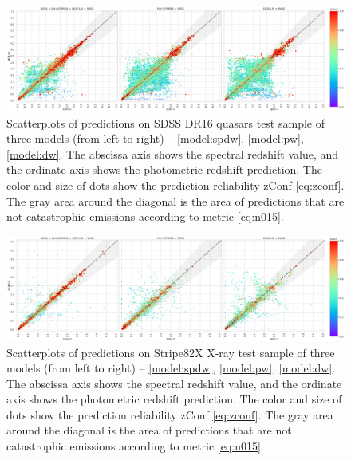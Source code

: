 \documentclass[fleqn,usenatbib]{mnras}
\begin{document}
\begin{figure}
    \centering
    \includegraphics[width=0.9\linewidth]{images/scatterplots-dr16q-wo-train.png}
    \caption{Scatterplots of predictions on SDSS DR16 quasars test sample of three models (from left to right) -- \ref{model:spdw}, \ref{model:pw}, \ref{model:dw}. The abscissa axis shows the spectral redshift value, and the ordinate axis shows the photometric redshift prediction. The color and size of dots show the prediction reliability zConf \eqref{eq:zconf}. The gray area around the diagonal is the area of predictions that are not catastrophic emissions according to metric \eqref{eq:n015}.}
    \label{fig:dr16q_wo_train}
\end{figure}

\begin{figure}
    \centering
    \includegraphics[width=0.9\linewidth]{images/scatterplots-stripe82x.png}
    \caption{Scatterplots of predictions on Stripe82X X-ray test sample of three models (from left to right) -- \ref{model:spdw}, \ref{model:pw}, \ref{model:dw}. The abscissa axis shows the spectral redshift value, and the ordinate axis shows the photometric redshift prediction. The color and size of dots show the prediction reliability zConf \eqref{eq:zconf}. The gray area around the diagonal is the area of predictions that are not catastrophic emissions according to metric \eqref{eq:n015}.}
    \label{fig:s82x}
\end{figure}
\end{document}
